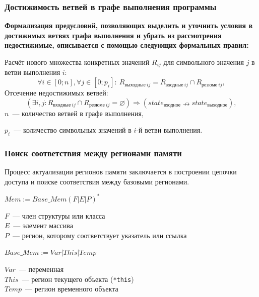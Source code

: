 \documentclass[hyperref={pdfpagelabels=false},10pt,gray]{beamer}
\begin{document}
\begin{frame}
\frametitle{Достижимость ветвей в графе выполнения программы}

\textbf{Формализация предусловий, позволяющих выделить и уточнить условия в достижимых ветвях графа выполнения и убрать из рассмотрения недостижимые, описывается с помощью следующих формальных правил: }

\vspace{20pt}

Расчёт нового множества конкретных значений $R_{ij}$ для символьного значения $j$ в ветви выполнения $i$:
\begin{equation*}
\label{result_sval}
 \forall i \in [0; n], \forall j \in [0; p_i]:\ R_{\text{выходные}\ ij} =  R_{\text{входные}\ ij} \cap R_{\text{резюме}\ ij},
\end{equation*}
Отсечение недостижимых ветвей:
\begin{equation*}
 \label{empty_set}
 (\exists i, j: R_{\text{входные}\ ij} \cap R_{\text{резюме}\ ij} = \varnothing)  \Rightarrow (state_{\text{входное}} \nrightarrow state_{\text{выходное}}),
\end{equation*}
$n$~--- количество ветвей в графе выполнения,

$p_{i}$~--- количество символьных значений в $i$-й ветви выполнения.


\end{frame}


\begin{frame}
\frametitle{Поиск соответствия между регионами памяти}
Процесс актуализации регионов памяти заключается в построении цепочки доступа и поиске соответствия между базовыми регионами.
\vspace{10pt}

$Mem := Base\_Mem(F|E|P)^*$

\vspace{10pt}

$F$~--- член структуры или класса\\
$E$~--- элемент массива\\
$P$~--- регион, которому соответствует указатель или ссылка

\vspace{10pt}

$Base\_Mem := Var|This|Temp$

\vspace{10pt}

$Var$~--- переменная\\
$This$~--- регион текущего объекта (\texttt{*this})\\
$Temp$~--- регион временного объекта


\end{frame}
\end{document}
